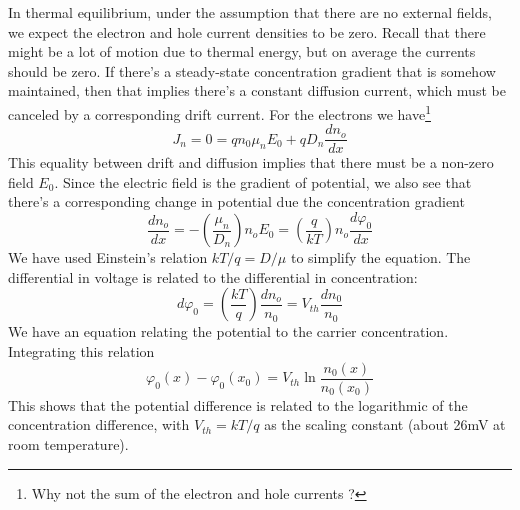 In thermal equilibrium, under the assumption that there are no external fields, we expect the electron and hole current densities to be zero.  Recall that there might be a lot of motion due to thermal energy, but on average the currents should be zero.  If there's a steady-state concentration gradient that is somehow maintained, then that implies there's a constant diffusion current, which must be canceled by a corresponding drift current.  For the electrons we have\footnote{Why not the sum of the electron and hole currents ?}
% 
\begin{equation}
	{J_n} = 0 = q{n_0}{\mu _n}{E_0} + q{D_n}\frac{{d{n_o}}}{{dx}} 
\end{equation}
%
This equality between drift and diffusion implies that there must be a non-zero field $E_0$.  Since the electric field is the gradient of potential, we also see that there's a corresponding change in potential due the concentration gradient
%
\begin{equation} 
	\frac{{d{n_o}}}{{dx}} =  - \left( {\frac{{{\mu _n}}}{{{D_n}}}} \right){n_o}{E_0} = \left( {\frac{q}{{kT}}} \right){n_o}\frac{{d{\varphi _0}}}{{dx}} 
\end{equation}
We have used Einstein's relation $kT/q = D/\mu$ to simplify the equation.   The differential in voltage is related to the differential in concentration:
\begin{equation} 
	d{\varphi _0} = \left( {\frac{{kT}}{q}} \right)\frac{{d{n_o}}}{{{n_0}}} = {V_{th}}\frac{{d{n_0}}}{{{n_0}}} 
\end{equation}
%
We have an equation relating the potential to the carrier concentration.  Integrating this relation
%
\begin{equation} {\varphi _0}(x) - {\varphi _0}({x_0}) = {V_{th}}\ln 
	\frac{{{n_0}(x)}}{{{n_0}({x_0})}}
\end{equation}
% 
This shows that the potential difference is related to the logarithmic  of the concentration difference, with $V_{th} = kT/q$ as the scaling constant (about 26mV at room temperature). 


